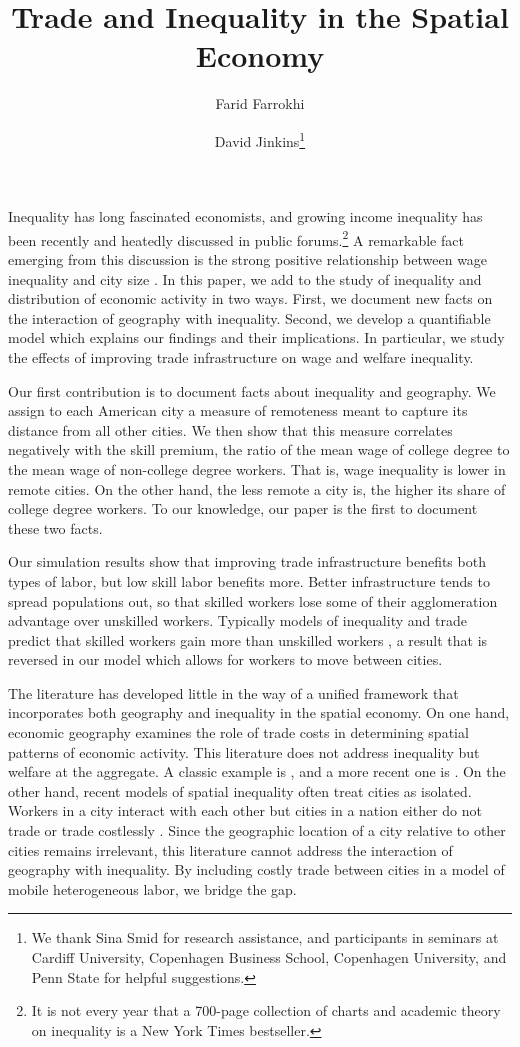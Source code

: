 \documentclass[12 pt]{article}
\title{Trade and Inequality in the Spatial Economy}
\author[1]{Farid Farrokhi}
\author[2]{David Jinkins\thanks{We thank Sina Smid for research assistance, and participants in seminars at Cardiff University, Copenhagen Business School, Copenhagen University, and Penn State for helpful suggestions.}}
\affil[1]{Penn State}
\affil[2]{Copenhagen Business School}
\begin{document}
\maketitle

Inequality has long fascinated economists, and growing income inequality has been recently and heatedly discussed in public forums.\footnote{It is not every year that a 700-page collection of charts and academic theory on inequality is a New York Times bestseller.} A remarkable fact emerging from this discussion is the strong positive relationship between wage inequality and city size \citep{baum2012understanding}.  In this paper, we add to the study of inequality and distribution of economic activity in two ways. First, we document new facts on the interaction of geography with inequality. Second, we develop a quantifiable model which explains our findings and their implications. In particular, we study the effects of improving trade infrastructure on wage and welfare inequality.

Our first contribution is to document facts about inequality and geography.  We assign to each American city a measure of remoteness meant to capture its distance from all other cities.  We then show that this measure correlates negatively with the skill premium, the ratio of the mean wage of college degree to the mean wage of non-college degree workers. That is, wage inequality is lower in remote cities. On the other hand, the less remote a city is, the higher its share of college degree workers. To our knowledge, our paper is the first to document these two facts.

Our simulation results show that improving trade infrastructure benefits both types of labor, but low skill labor benefits more.  Better infrastructure tends to spread populations out, so that skilled workers lose some of their agglomeration advantage over unskilled workers.  Typically models of inequality and trade predict that skilled workers gain more than unskilled workers \citep{antras2006offshoring}, a result that is reversed in our model which allows for workers to move between cities.

The literature has developed little in the way of a unified framework that incorporates both geography and inequality in the spatial economy. On one hand, economic geography examines the role of trade costs in determining spatial patterns of economic activity. This literature does not address inequality but welfare at the aggregate.  A classic example is \citep{krugman1991increasing}, and a more recent one is \citet{allen2014trade}. On the other hand, recent models of spatial inequality often treat cities as isolated. Workers in a city interact with each other but cities in a nation either do not trade or trade costlessly \citep{davis2014comparative}. Since the geographic location of a city relative to other cities remains irrelevant, this literature cannot address the interaction of geography with inequality. By including costly trade between cities in a model of mobile heterogeneous labor, we bridge the gap.
\end{document}
